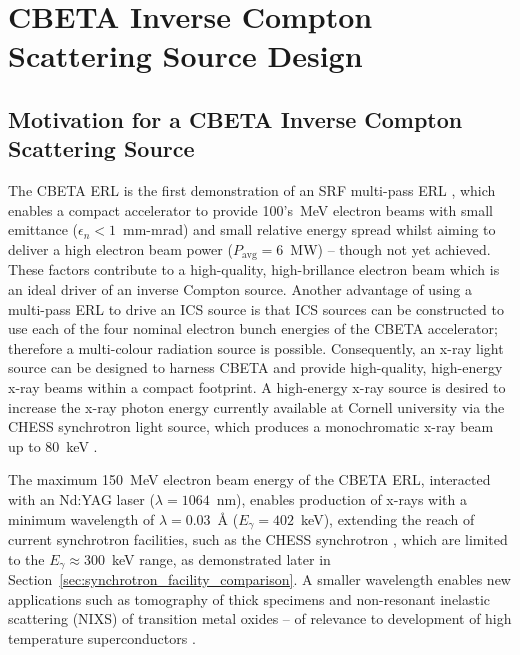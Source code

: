 \documentclass[../main.tex]{subfiles}
\begin{document}
\chapter{CBETA Inverse Compton Scattering Source Design}
\label{CBETA_Inverse_Compton_Scattering_Source_Design} %

\section{Motivation for a CBETA Inverse Compton Scattering Source}

The CBETA ERL is the first demonstration of an SRF multi-pass ERL \cite{bartnik2020cbeta}, which enables a compact accelerator to provide 100's~\si{\mega\electronvolt} electron beams with small emittance ($\epsilon_{n} < 1$~\si{\milli\meter}-\si{\milli\radian}) and small relative energy spread whilst aiming to deliver a high electron beam power ($P_{\mathrm{avg}} = 6$~\si{\mega\watt}) -- though not yet achieved. These factors contribute to a high-quality, high-brillance electron beam which is an ideal driver of an inverse Compton source. Another advantage of using a multi-pass ERL to drive an ICS source is that ICS sources can be constructed to use each of the four nominal electron bunch energies of the CBETA accelerator; therefore a multi-colour radiation source is possible. Consequently, an x-ray light source can be designed to harness CBETA and provide high-quality, high-energy x-ray beams within a compact footprint. A high-energy x-ray source is desired to increase the x-ray photon energy currently available at Cornell university via the CHESS synchrotron light source, which produces a monochromatic x-ray beam up to 80~\si{\kilo\electronvolt} \cite{CHESSstructuralmaterialsbeamline}. 

The maximum 150~\si{\mega\electronvolt} electron beam energy of the CBETA ERL, interacted with an Nd:YAG laser ($\lambda=1064$~\si{\nano\meter}), enables production of x-rays with a minimum wavelength of $\lambda = 0.03$~\si{\angstrom} ($E_{\gamma} = 402$~\si{\kilo\electronvolt}), extending the reach of current synchrotron facilities, such as the CHESS synchrotron \cite{CHESSstructuralmaterialsbeamline}, which are limited to the $E_{\gamma} \approx 300$~\si{\kilo\electronvolt} range, as demonstrated later in Section~\ref{sec:synchrotron_facility_comparison}. A smaller wavelength enables new applications such as tomography of thick specimens and non-resonant inelastic scattering (NIXS) of transition metal oxides -- of relevance to development of high temperature superconductors \cite{isaacs1996resonant}.
 
\end{document}
